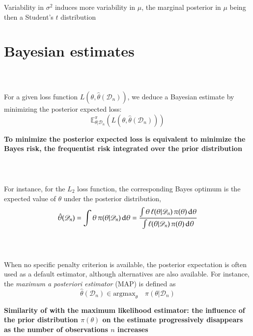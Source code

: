 \documentclass[notes,professionalfont,11pt,usenames,dvipsnames]{beamer}
\renewcommand{\mathcal}{\mathscr}
\newcommand{\ds}{\displaystyle}
\newcommand{\vs}{\bigskip}
\renewcommand{\mathcal}{\mathscr}
\newcommand{\E}{\mathbb{E}}
\newcommand\justify{\rightskip0pt \leftskip0pt}
\newenvironment{slide}
{\begin{frame}[environment=slide]
\frametitle{\insertsection \\ \insertsubsection}\justify\setlength{\parskip}{0.5cm}\vspace{-1cm}}
{\end{frame}}
\begin{document}
\begin{slide}

Variability in $\sigma^2$ induces more variability in $\mu$, the marginal 
posterior in $\mu$ being then a Student's $t$ distribution


\vs \centerline{\color{red}\fbox{
$\ds \mu|\mathcal{D}_n \sim \mathcal{T}\left(n+2,\frac{n\bar x}{n+1},\frac{2+s^2+(n\bar x)/(n+1)}{(n+1)(n+2)}\right)$
}}

\end{slide}

\section{Bayesian estimates}

\begin{slide}

For a given loss function $L\left(\theta,\hat\theta(\mathcal{D}_n)\right)$,
we deduce a Bayesian estimate by minimizing the posterior expected loss:
$$
\E^\pi_{\theta|\mathcal{D}_n}\left(L\left(\theta,\hat\theta(\mathcal{D}_n)\right)\right)
$$


{\bf \color{red} To minimize the posterior expected loss 
is equivalent to minimize the Bayes risk, 
the frequentist risk integrated over the prior distribution
}

\end{slide}

\begin{slide}

For instance, for the $L_2$ loss function,
the corresponding Bayes optimum is the expected value of $\theta$
under the posterior distribution,
$$
\hat\theta(\mathcal{D}_n) = \int \theta \,\pi(\theta|\mathcal{D}_n)\,\hbox{d}\theta
                          = \frac{\int \theta\,\ell(\theta|\mathcal{D}_n)\,\pi(\theta)\,\hbox{d}\theta}
                           {\int \ell(\theta|\mathcal{D}_n)\,\pi(\theta)\,\hbox{d}\theta}
$$

\end{slide}

\begin{slide}
\begin{minipage}{\linewidth}

When no specific penalty criterion is available, the posterior expectation is often used
as a default estimator, although alternatives are also available. For 
instance, the {\em maximum a posteriori estimator} (MAP) is defined as
$$
\hat\theta(\mathcal{D}_n) \in \text{argmax}_\theta \quad\pi(\theta|\mathcal{D}_n)
$$


{\bf \color{red} Similarity of with the maximum likelihood estimator: the influence of the prior
distribution $\pi(\theta)$ on the estimate progressively disappears as the number
of observations $n$ increases}

\end{minipage}
\end{slide}
\end{document}
